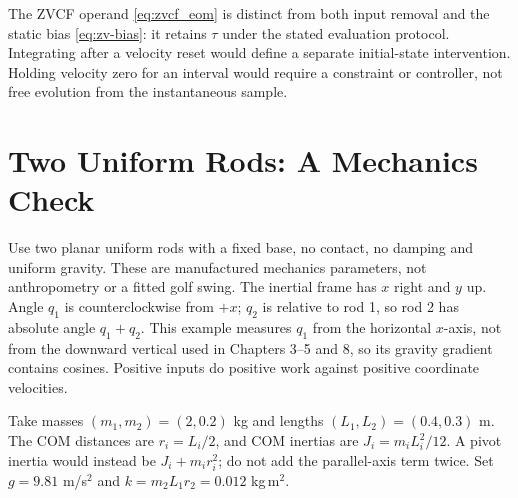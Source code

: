 The ZVCF operand \eqref{eq:zvcf_eom} is distinct from both input removal and the static bias \eqref{eq:zv-bias}: it retains $\tau$ under the stated evaluation protocol. Integrating after a velocity reset would define a separate initial-state intervention. Holding velocity zero for an interval would require a constraint or controller, not free evolution from the instantaneous sample.

\section{Two Uniform Rods: A Mechanics Check}
\label{sec:double_pendulum_ztcf}

Use two planar uniform rods with a fixed base, no contact, no damping and uniform gravity. These are manufactured mechanics parameters, not anthropometry or a fitted golf swing. The inertial frame has $x$ right and $y$ up. Angle $q_1$ is counterclockwise from $+x$; $q_2$ is relative to rod 1, so rod 2 has absolute angle $q_1+q_2$. This example measures $q_1$ from the horizontal $x$-axis, not from the downward vertical used in Chapters 3--5 and 8, so its gravity gradient contains cosines. Positive inputs do positive work against positive coordinate velocities.

Take masses $(m_1,m_2)=(2,0.2)$ kg and lengths $(L_1,L_2)=(0.4,0.3)$ m. The COM distances are $r_i=L_i/2$, and COM inertias are $J_i=m_iL_i^2/12$. A pivot inertia would instead be $J_i+m_ir_i^2$; do not add the parallel-axis term twice. Set $g=9.81$ m/s$^2$ and $k=m_2L_1r_2=0.012$ kg\,m$^2$.

